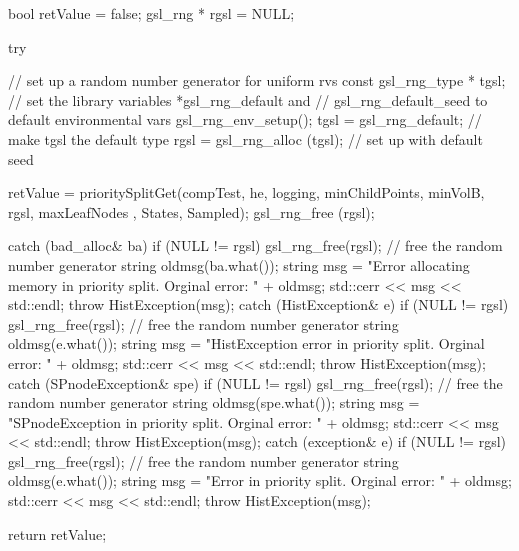 \begin{DoxyCode}
{
    bool retValue = false;
    gsl_rng * rgsl = NULL;

    try {
        // set up a random number generator for uniform rvs
        const gsl_rng_type * tgsl;
        // set the library variables *gsl_rng_default and
        // gsl_rng_default_seed to default environmental vars
        gsl_rng_env_setup();
        tgsl = gsl_rng_default; // make tgsl the default type
        rgsl = gsl_rng_alloc (tgsl); // set up with default seed

        retValue = prioritySplitGet(compTest, he, logging,
                                    minChildPoints, minVolB, rgsl, maxLeafNodes
      ,
                                    States, Sampled);
        gsl_rng_free (rgsl);
    }

    catch (bad_alloc& ba) {
        if (NULL != rgsl) gsl_rng_free(rgsl); // free the random number
       generator
        string oldmsg(ba.what());
        string msg = "Error allocating memory in priority split.  Orginal
       error: "
                                     + oldmsg;
        std::cerr << msg << std::endl;
        throw HistException(msg);
    }
    catch (HistException& e) {
        if (NULL != rgsl) gsl_rng_free(rgsl); // free the random number
       generator
        string oldmsg(e.what());
        string msg = "HistException error in priority split.  Orginal error: "
                                    + oldmsg;
        std::cerr << msg << std::endl;
        throw HistException(msg);
    }
    catch (SPnodeException& spe) {
        if (NULL != rgsl) gsl_rng_free(rgsl); // free the random number
       generator
        string oldmsg(spe.what());
        string msg = "SPnodeException in priority split.  Orginal error: "
                                    + oldmsg;
        std::cerr << msg << std::endl;
        throw HistException(msg);
    }
    catch (exception& e) {
        if (NULL != rgsl) gsl_rng_free(rgsl); // free the random number
       generator
        string oldmsg(e.what());
        string msg = "Error in priority split.  Orginal error: " + oldmsg;
        std::cerr << msg << std::endl;
        throw HistException(msg);
    }

    return retValue;
}
\end{DoxyCode}

